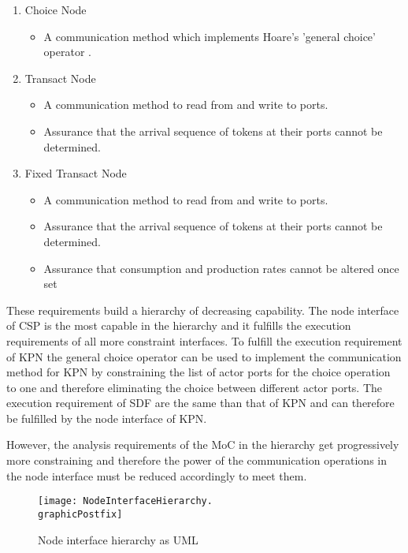 \begin{enumerate}
\item Choice Node
  \begin{itemize}
  \item  A communication method which implements Hoare's 'general choice' operator \cite{csphoare:1985}.
  \end  {itemize}
\item Transact Node
  \begin{itemize}
  \item A communication method to read from and write to ports.
  \item Assurance that the arrival sequence of tokens at
        their ports cannot be determined.
  \end  {itemize}
\item Fixed Transact Node
  \begin{itemize}
  \item A communication method to read from and write to ports.
  \item Assurance that the arrival sequence of tokens at
        their ports cannot be determined.
  \item Assurance that consumption and production rates cannot
        be altered once set
  \end  {itemize}
\end{enumerate}

These requirements build a hierarchy of decreasing capability. The node
interface of CSP is the most capable in the hierarchy and it
fulfills the execution requirements of all more constraint interfaces.
To fulfill the execution requirement of KPN the general choice operator
can be used to implement the communication method for KPN by constraining
the list of actor ports for the choice operation to one and therefore
eliminating the choice between different actor ports.
The execution requirement of SDF are the same than that of KPN and can
therefore be fulfilled by the node interface of KPN.

However, the analysis requirements of the MoC in the hierarchy
get progressively more constraining and therefore the power
of the communication operations in the node interface must
be reduced accordingly to meet them.

\begin{figure}
\centering
\texttt{[image: NodeInterfaceHierarchy.\\graphicPostfix]}\\
\caption{\label{node-interface-hierarchy}Node interface hierarchy as UML}
\end{figure}

